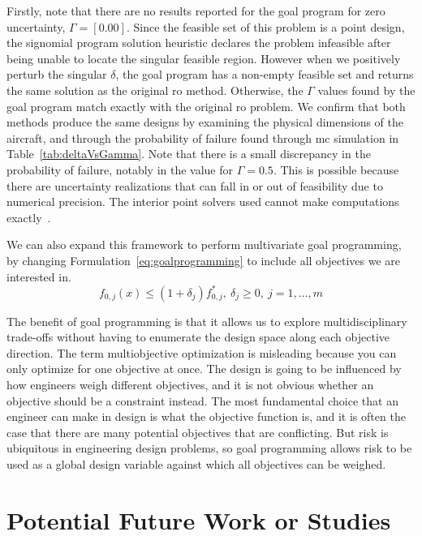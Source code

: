 Firstly, note that there are no results reported for the goal program
for zero uncertainty, $\Gamma = [0.00]$.
Since the feasible set of this problem is a point design, the signomial program
solution heuristic declares the problem infeasible after being
unable to locate the singular feasible region. However when we positively perturb
the singular $\delta$, the goal program has a non-empty feasible set and
returns the same solution as the original \gls{ro} method.
Otherwise, the $\Gamma$ values found by the goal program match exactly
with the original \gls{ro} problem. We confirm that both methods produce
the same designs by examining the physical dimensions of the aircraft, and through the probability
of failure found through \gls{mc} simulation in Table~\ref{tab:deltaVsGamma}.
Note that there is a small discrepancy
in the probability of failure, notably in the value for $\Gamma = 0.5$. This is
possible because there are uncertainty realizations that can fall
in or out of feasibility due to numerical precision. The interior point solvers
used cannot make computations exactly~\cite{Nesterov1994}.

We can also expand this framework to perform multivariate goal programming,
by changing Formulation~\ref{eq:goalprogramming} to include all
objectives we are interested in.
\begin{equation}
    f_{0,j}(x) \leq (1+\delta_j) f^*_{0,j},~\delta_j \geq 0,~j = 1,\ldots, m
    \label{eq:multigoal}
\end{equation}

The benefit of goal programming is that it allows us to explore multidisciplinary trade-offs without
having to enumerate the design space along each objective direction.
The term multiobjective optimization is misleading
because you can only optimize for one objective at once.
The design is going to be influenced by how engineers weigh different objectives, and
it is not obvious whether an objective should be a constraint instead. The most
fundamental choice that an engineer can make in design is what the objective function is, and it is
often the case that there are many potential objectives that are conflicting.
But risk is ubiquitous in engineering design problems, so goal programming allows risk to be used as
a global design variable against which all objectives can be weighed.

\section{Potential Future Work or Studies}

